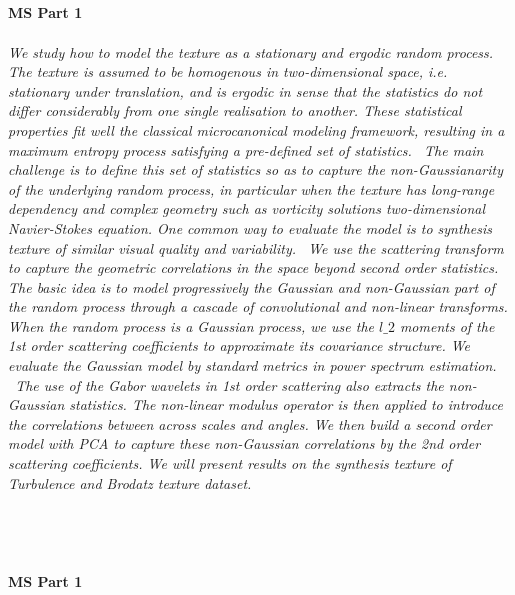 \begin{multicols}{2}
\\ 
    \\
    \\\\
    \noindent\textbf{MS Part 1}\\
\\  
    \textit{We study how to model the texture as a stationary and ergodic random process. The texture is assumed to be homogenous in two-dimensional space, i.e. stationary under translation, and is ergodic in sense that the statistics do not differ considerably from one single realisation to another. These statistical properties fit well the classical microcanonical modeling framework, resulting in a maximum entropy process satisfying a pre-defined set of statistics.
\
The main challenge is to define this set of statistics so as to capture the non-Gaussianarity of the underlying random process, in particular when the texture has long-range dependency and complex geometry such as vorticity solutions two-dimensional Navier-Stokes equation. One common way to evaluate the model is to synthesis texture of similar visual quality and variability.
\
We use the scattering transform to capture the geometric correlations in the space beyond second order statistics. 
The basic idea is to model progressively the Gaussian and non-Gaussian part of the random process through a cascade of convolutional and non-linear transforms. When the random process is a Gaussian process, we use the $l\_2$ moments of the 1st order scattering coefficients to approximate its covariance structure. We evaluate the Gaussian model by standard metrics in power spectrum estimation. 
\
The use of the Gabor wavelets in 1st order scattering also extracts the non-Gaussian statistics. The non-linear modulus operator is then applied to introduce the correlations between across scales and angles. We then build a second order model with PCA to capture these non-Gaussian correlations by the 2nd order scattering coefficients. We will present results on the synthesis texture of Turbulence and Brodatz texture dataset. }\\
\\ 
    \\
    \mail{sixin.zhang@ens.fr}\\\\
    \noindent\textbf{MS Part 1}\\
\\  
    \textit{}\\
\\ 

\end{multicols}
